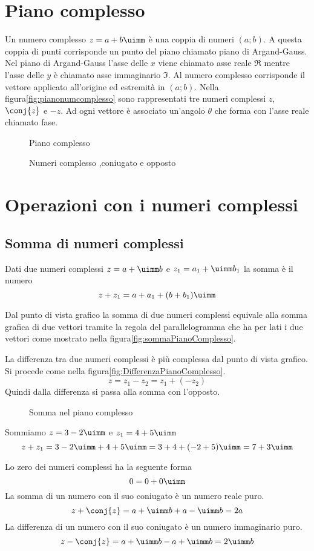 \section{Piano complesso}
Un numero complesso $z=a+b\uimm$ è una coppia di numeri $(a;b)$. A questa coppia di punti corrisponde un punto del piano chiamato piano di  Argand-Gauss. 
Nel piano di Argand-Gauss l'asse delle $x$ viene chiamato asse reale $\Re$ mentre l'asse delle $y$ è chiamato asse immaginario $\Im$.
Al numero complesso corrisponde il vettore applicato all'origine ed estremità in $(a;b)$. Nella figura\nobs\vref{fig:pianonumcomplesso} sono rappresentati tre numeri complessi $z$, $\conj{z}$ e $-z$. Ad ogni vettore è associato un'angolo $\theta$ che forma con l'asse reale chiamato fase. 
\begin{figure}
	\centering
	
	\caption{Piano complesso}
	\label{fig:nuncomplPianoComplesso}
\end{figure}
\begin{figure} %
	\centering

	\caption{Numeri complesso ,coniugato e opposto}
	\label{fig:pianonumcomplesso}
\end{figure}
\section{Operazioni con i numeri complessi}
\label{sec:NumCompOperazioni}
\subsection{Somma di numeri complessi}
\begin{definizione}
Dati due numeri complessi  $z=a+\uimm b$ e  $z_1=a_1+\uimm b_1$ la somma è il numero \[z+z_1=a+a_1+(b+b_1)\uimm\]
\end{definizione}
Dal punto di vista grafico la somma di due numeri complessi equivale alla somma grafica di due vettori tramite la regola del parallelogramma che ha per lati i due vettori come mostrato nella figura\nobs\vref{fig:sommaPianoComplesso}.

La differenza tra due numeri complessi è più complessa dal punto di vista grafico. Si procede come nella figura\nobs\vref{fig:DifferenzaPianoComplesso}. \[ z=z_1-z_2=z_1+(-z_2)\]  Quindi dalla differenza si passa alla somma con l'opposto.
\begin{figure}
	\centering
	
	\caption{Somma nel piano complesso}
	\label{fig:sommaPianoComplesso}
\end{figure}
\begin{esempio}
Sommiamo $z=3-2\uimm$ e $z_1=4+5\uimm$
	\[z+z_1=3-2\uimm +4+5\uimm=3+4+(-2+5)\uimm=7+3\uimm\]
\end{esempio}
Lo zero dei numeri complessi ha la seguente forma
\[0=0+0\uimm\]
La somma di un numero con il suo coniugato è un numero reale puro. \[z+\conj{z}=a+\uimm b+a-\uimm b=2a \] 
La differenza di un numero con il suo coniugato è un numero immaginario puro. \[z-\conj{z}=a+\uimm b-a+\uimm b=2\uimm b \] 

